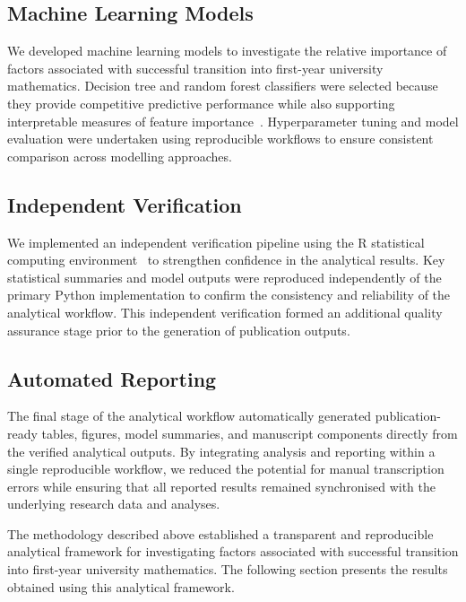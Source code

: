 \subsection{Machine Learning Models} 
\label{sec:ml_models}

We developed machine learning models to investigate the relative importance of factors associated with successful transition into first-year university mathematics. 
Decision tree and random forest classifiers were selected because they provide competitive predictive performance while also supporting interpretable measures of 
feature importance~\cite{Breiman1984,Breiman2001}. Hyperparameter tuning and model evaluation were undertaken using reproducible workflows to ensure consistent 
comparison across modelling approaches.



\subsection{Independent Verification} 

We implemented an independent verification pipeline using the R statistical computing environment~\cite{RCoreTeam2026,Hinz2018rcss,Hinz2021} to strengthen confidence in the 
analytical results. Key statistical summaries and model outputs were reproduced independently of the primary Python implementation to confirm the consistency 
and reliability of the analytical workflow. This independent verification formed an additional quality assurance stage prior to the generation of publication outputs. 



\subsection{Automated Reporting} 

The final stage of the analytical workflow automatically generated publication-ready tables, figures, model summaries, and manuscript components directly from the 
verified analytical outputs. By integrating analysis and reporting within a single reproducible workflow, we reduced the potential for manual transcription 
errors while ensuring that all reported results remained synchronised with the underlying research data and analyses.



The methodology described above established a transparent and reproducible analytical framework for investigating factors associated with successful transition into first-year 
university mathematics. The following section presents the results obtained using this analytical framework.


